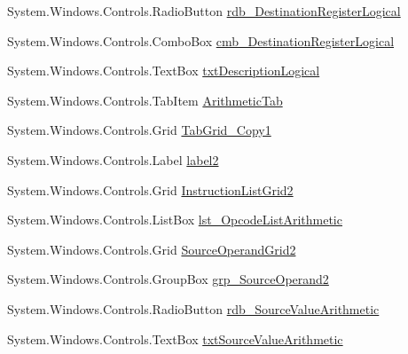 \begin{DoxyCompactItemize}
\item 
System.\+Windows.\+Controls.\+Radio\+Button \hyperlink{class_c_p_u___o_s___simulator_1_1_instructions_window_a3670f5971b586bd8977a78bcde185a35}{rdb\+\_\+\+Destination\+Register\+Logical}
\item 
System.\+Windows.\+Controls.\+Combo\+Box \hyperlink{class_c_p_u___o_s___simulator_1_1_instructions_window_aefcd87b5db00ac68e7d80ac5fddce8c5}{cmb\+\_\+\+Destination\+Register\+Logical}
\item 
System.\+Windows.\+Controls.\+Text\+Box \hyperlink{class_c_p_u___o_s___simulator_1_1_instructions_window_ae465810d61bb136b7934563cf85b3027}{txt\+Description\+Logical}
\item 
System.\+Windows.\+Controls.\+Tab\+Item \hyperlink{class_c_p_u___o_s___simulator_1_1_instructions_window_aabf61d7cbf8be85bb4ab0ef2d0614b46}{Arithmetic\+Tab}
\item 
System.\+Windows.\+Controls.\+Grid \hyperlink{class_c_p_u___o_s___simulator_1_1_instructions_window_a834965d0ae6a57edb71a818dca188a30}{Tab\+Grid\+\_\+\+Copy1}
\item 
System.\+Windows.\+Controls.\+Label \hyperlink{class_c_p_u___o_s___simulator_1_1_instructions_window_a237621e58e68c4a07cdf8803cc1614fd}{label2}
\item 
System.\+Windows.\+Controls.\+Grid \hyperlink{class_c_p_u___o_s___simulator_1_1_instructions_window_a33108da9779c5108fc5dd303a8d33454}{Instruction\+List\+Grid2}
\item 
System.\+Windows.\+Controls.\+List\+Box \hyperlink{class_c_p_u___o_s___simulator_1_1_instructions_window_a7445b276d3723f67ba564038940d44c5}{lst\+\_\+\+Opcode\+List\+Arithmetic}
\item 
System.\+Windows.\+Controls.\+Grid \hyperlink{class_c_p_u___o_s___simulator_1_1_instructions_window_a715ed01337540f316f39fe42c373c602}{Source\+Operand\+Grid2}
\item 
System.\+Windows.\+Controls.\+Group\+Box \hyperlink{class_c_p_u___o_s___simulator_1_1_instructions_window_ad37aae3614abd76749236a7739fbc18b}{grp\+\_\+\+Source\+Operand2}
\item 
System.\+Windows.\+Controls.\+Radio\+Button \hyperlink{class_c_p_u___o_s___simulator_1_1_instructions_window_a627e9cbe7e0cb2ce0f109f2345e19b73}{rdb\+\_\+\+Source\+Value\+Arithmetic}
\item 
System.\+Windows.\+Controls.\+Text\+Box \hyperlink{class_c_p_u___o_s___simulator_1_1_instructions_window_afc01788dc74f761b6cce800975394d2e}{txt\+Source\+Value\+Arithmetic}
\item 

\end{DoxyCompactItemize}
